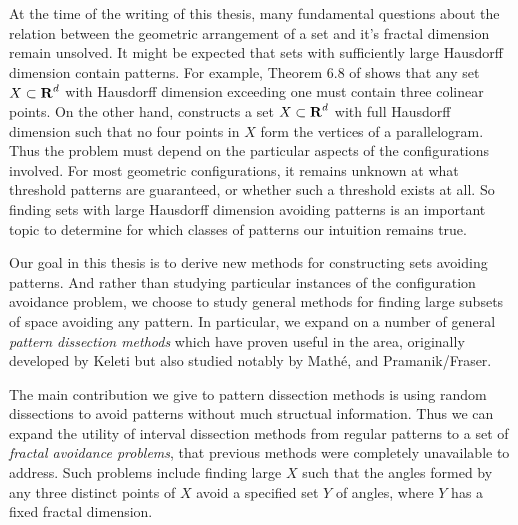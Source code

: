 At the time of the writing of this thesis, many fundamental questions about the relation between the geometric arrangement of a set and it's fractal dimension remain unsolved. It might be expected that sets with sufficiently large Hausdorff dimension contain patterns. For example, Theorem 6.8 of \cite{Matilla} shows that any set $X \subset \operatorname{\mathbf{R}}^d$ with Hausdorff dimension exceeding one must contain three colinear points. On the other hand, \cite{Maga} constructs a set $X \subset \operatorname{\mathbf{R}}^d$ with full Hausdorff dimension such that no four points in $X$ form the vertices of a parallelogram. Thus the problem must depend on the particular aspects of the configurations involved. For most geometric configurations, it remains unknown at what threshold patterns are guaranteed, or whether such a threshold exists at all. So finding sets with large Hausdorff dimension avoiding patterns is an important topic to determine for which classes of patterns our intuition remains true.

Our goal in this thesis is to derive new methods for constructing sets avoiding patterns. And rather than studying particular instances of the configuration avoidance problem, we choose to study general methods for finding large subsets of space avoiding any pattern. In particular, we expand on a number of general {\it pattern dissection methods} which have proven useful in the area, originally developed by Keleti but also studied notably by Math\'{e}, and Pramanik/Fraser.

The main contribution we give to pattern dissection methods is using random dissections to avoid patterns without much structual information. Thus we can expand the utility of interval dissection methods from regular patterns to a set of {\it fractal avoidance problems}, that previous methods were completely unavailable to address. Such problems include finding large $X$ such that the angles formed by any three distinct points of $X$ avoid a specified set $Y$ of angles, where $Y$ has a fixed fractal dimension.

\endinput

Any text after an \endinput is ignored.
You could put scraps here or things in progress.